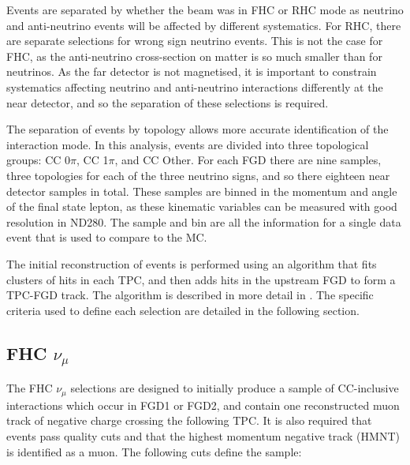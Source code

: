 Events are separated by whether the beam was in FHC or RHC mode as neutrino and anti-neutrino events will be affected by different systematics. For RHC, there are separate selections for wrong sign neutrino events. This is not the case for FHC, as the anti-neutrino cross-section on matter is so much smaller than for neutrinos. As the far detector is not magnetised, it is important to constrain systematics affecting neutrino and anti-neutrino interactions differently at the near detector, and so the separation of these selections is required. 

The separation of events by topology allows more accurate identification of the interaction mode. In this analysis, events are divided into three topological groups: CC 0$\pi$, CC 1$\pi$, and CC Other. For each FGD there are nine samples, three topologies for each of the three neutrino signs, and so there eighteen near detector samples in total. These samples are binned in the momentum and angle of the final state lepton, as these kinematic variables can be measured with good resolution in ND280. The sample and bin are all the information for a single data event that is used to compare to the MC. 

The initial reconstruction of events is performed using an algorithm that fits clusters of hits in each TPC, and then adds hits in the upstream FGD to form a TPC-FGD track. The algorithm is described in more detail in \cite{tn212}. The specific criteria used to define each selection are detailed in the following section. 

\subsection{FHC $\nu_{\mu}$}

The FHC $\nu_{\mu}$ selections are designed to initially produce a sample of CC-inclusive interactions which occur in FGD1 or FGD2, and contain one reconstructed muon track of negative charge crossing the following TPC. It is also required that events pass quality cuts and that the highest momentum negative track (HMNT) is identified as a muon. The following cuts define the sample:

